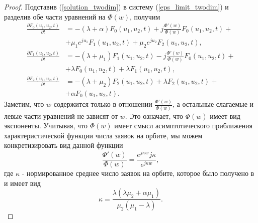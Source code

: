 \begin{proof}
	Подставив (\ref{solution_twodim}) в систему (\ref{eps_limit_twodim}) и разделив обе части уравнений на $\Phi(w)$, получим
	\begin{equation} \label{preresult_twodim}
		\begin{split}
			\frac{{\partial F_{0}(u_{1},u_{2},t)}}{{\partial t}} &= -(\lambda + \alpha)F_{0}(u_{1},u_{2},t) + j
			\frac{\Phi'(w) }{\Phi(w)}F_{0}(u_{1},u_{2},t) +\\  &+ \mu_{1} e^{ju_{1}}F_{1}(u_{1},u_{2},t) + \mu_{2}e^{ju_{2}}F_{2}(u_{1},u_{2},t) ,
			\\
			\frac{{\partial F_{1}(u_{1},u_{2},t)}}{{\partial t}} &= -(\lambda + \mu_{1})F_{1}(u_{1},u_{2},t) - j 
			\frac{\Phi'(w) }{\Phi(w)}F_{0}(u_{1},u_{2},t) +\\  &+ \lambda F_{0}(u_{1},u_{2},t) + \lambda F_{1}(u_{1},u_{2},t) ,
			\\
			\frac{{\partial F_{2}(u_{1},u_{2},t)}}{{\partial t}} &= -(\lambda + \mu_{2})F_{2}(u_{1},u_{2},t)  + \lambda F_{2}(u_{1},u_{2},t) +\\  &+ \alpha F_{0}(u_{1},u_{2},t).
		\end{split}
	\end{equation}  
	Заметим, что $w$ содержится только в отношении $\frac{\Phi'(w) }{\Phi(w)}$, а остальные слагаемые и левые части уравнений не зависят от $w$. Это означает, что  $\Phi(w)$ имеет вид экспоненты. Учитывая, что  $\Phi(w)$ имеет смысл асимптотического приближения характеристической функции числа заявок на орбите, мы можем конкретизировать вид данной функции
	\begin{equation*}
		\frac{\Phi'(w) }{\Phi(w)} = \frac{e^{j\kappa w}j\kappa}{e^{j\kappa w}},
	\end{equation*} 
	где $\kappa$ - нормированное среднее число заявок на орбите, которое было получено в \cite{nazarov2017asymptotic} и имеет вид 
	\begin{equation*}
		\kappa = \frac{\lambda(\lambda \mu_{2} + \alpha \mu_{1})}{\mu_{2}(\mu_{1} - \lambda)}.
	\end{equation*}
	

\end{proof}
